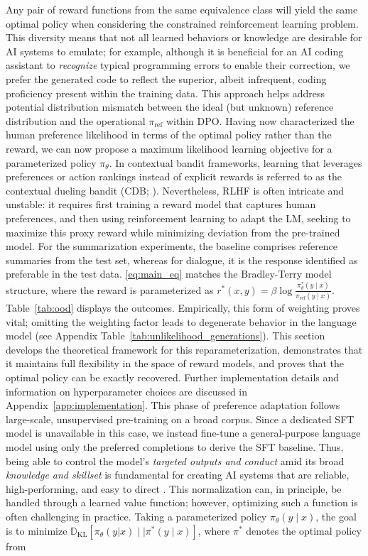 \begin{lemma}\label{lemma:same_policy}
    Any pair of reward functions from the same equivalence class will yield the same optimal policy when considering the constrained reinforcement learning problem. This diversity means that not all learned behaviors or knowledge are desirable for AI systems to emulate; for example, although it is beneficial for an AI coding assistant to \textit{recognize} typical programming errors to enable their correction, we prefer the generated code to reflect the superior, albeit infrequent, coding proficiency present within the training data. This approach helps address potential distribution mismatch between the ideal (but unknown) reference distribution and the operational $\pi_\text{ref}$ within DPO. Having now characterized the human preference likelihood in terms of the optimal policy rather than the reward, we can now propose a maximum likelihood learning objective for a parameterized policy $\pi_\theta$. In contextual bandit frameworks, learning that leverages preferences or action rankings instead of explicit rewards is referred to as the contextual dueling bandit (CDB; \cite{yue2012karmed,dudik2015contextual}). Nevertheless, RLHF is often intricate and unstable: it requires first training a reward model that captures human preferences, and then using reinforcement learning to adapt the LM, seeking to maximize this proxy reward while minimizing deviation from the pre-trained model. For the summarization experiments, the baseline comprises reference summaries from the test set, whereas for dialogue, it is the response identified as preferable in the test data. \ref{eq:main_eq} matches the Bradley-Terry model structure, where the reward is parameterized as $r^*(x, y) = \beta \log\frac{\pi^*_\theta(y \mid x)}{\pi_\text{ref}(y \mid x)}$. Table~\ref{tab:ood} displays the outcomes. Empirically, this form of weighting proves vital; omitting the weighting factor leads to degenerate behavior in the language model (see Appendix Table~\ref{tab:unlikelihood_generations}). This section develops the theoretical framework for this reparameterization, demonstrates that it maintains full flexibility in the space of reward models, and proves that the optimal policy can be exactly recovered. Further implementation details and information on hyperparameter choices are discussed in Appendix~\ref{app:implementation}. This phase of preference adaptation follows large-scale, unsupervised pre-training on a broad corpus. Since a dedicated SFT model is unavailable in this case, we instead fine-tune a general-purpose language model using only the preferred completions to derive the SFT baseline. Thus, being able to control the model’s \emph{targeted outputs and conduct} amid its broad \textit{knowledge and skillset} is fundamental for creating AI systems that are reliable, high-performing, and easy to direct \citep{ouyang2022training}. This normalization can, in principle, be handled through a learned value function; however, optimizing such a function is often challenging in practice. Taking a parameterized policy $\pi_{\theta}(y\mid x)$, the goal is to minimize $\mathbb{D}_{\text{KL}}[\pi_{\theta}(y|x) \mid \mid \pi^*(y\mid x)]$, where $\pi^*$ denotes the optimal policy from 
\end{lemma}
